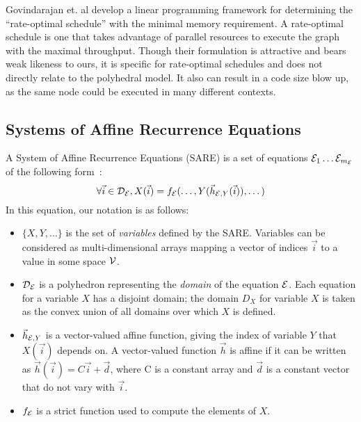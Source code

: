 Govindarajan et. al develop a linear programming framework for
determining the ``rate-optimal schedule'' with the minimal memory
requirement.  A rate-optimal schedule is one that takes advantage of
parallel resources to execute the graph with the maximal throughput.
Though their formulation is attractive and bears weak likeness to
ours, it is specific for rate-optimal schedules and does not directly
relate to the polyhedral model.  It also can result in a code size
blow up, as the same node could be executed in many different
contexts.

\subsection{Systems of Affine Recurrence Equations}

A System of Affine Recurrence Equations (SARE) is a set of equations
${\cal E}_1 \dots {\cal E}_{m_{\cal E}}$ of the following form~\cite{DRV00,Feautrier92i}:
\begin{equation}
\forall {\vec i} \in {\cal D_{\cal E}}, X({\vec i}) = f_{\cal E}(\dots, Y({\vec h}_{{\cal
E}, Y}({\vec i})), \dots)
\label{eq:sare}
\end{equation}
In this equation, our notation is as follows:
\begin{itemize}

\item $\{X, Y, \dots\}$ is the set of {\it variables} defined by the
SARE.  Variables can be considered as multi-dimensional arrays mapping
a vector of indices ${\vec i}$ to a value in some space ${\cal V}$.

\item ${\cal D_{\cal E}}$ is a polyhedron representing the {\it
domain} of the equation ${\cal E}$.  Each equation for a variable $X$
has a disjoint domain; the domain $D_X$ for variable $X$ is taken as
the convex union of all domains over which $X$ is defined.

\item ${\vec h}_{{\cal E}, Y}$ is a vector-valued affine function,
giving the index of variable $Y$ that $X({\vec i})$ depends on.  A
vector-valued function ${\vec h}$ is affine if it can be written as
${\vec h}({\vec i}) = C{\vec i} + {\vec d}$, where C is a constant
array and ${\vec d}$ is a constant vector that do not vary with ${\vec
i}$.

\item $f_{\cal E}$ is a strict function used to compute the elements
of $X$.

\end{itemize}


